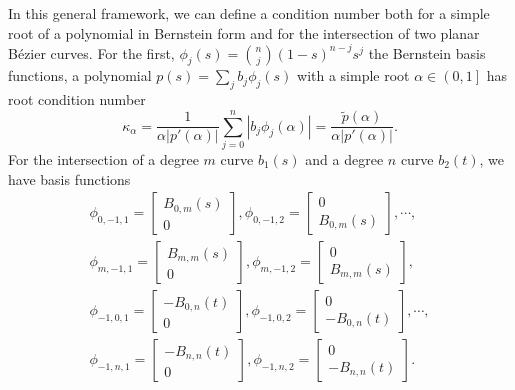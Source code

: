 In this general framework, we can define a condition number both
for a simple root of a polynomial in Bernstein form and for the
intersection of two planar B\'{e}zier curves. For the first,
\(\phi_j(s) = \binom{n}{j} (1 - s)^{n - j} s^j\) the Bernstein basis
functions, a polynomial \(p(s) = \sum_j b_j \phi_j(s)\) with
a simple root \(\alpha \in \left(0, 1\right]\) has root condition number
\begin{equation}
\kappa_{\alpha} =
  \frac{1}{\alpha \left|p'(\alpha)\right|} \sum_{j = 0}^n \left|
  b_j \phi_j(\alpha)\right| = \frac{\widetilde{p}(\alpha)}{
  \alpha \left|p'(\alpha)\right|}.
\end{equation}
For the intersection of a degree \(m\) curve \(b_1(s)\) and
a degree \(n\) curve \(b_2(t)\), we have basis functions
\begin{multline}
\phi_{0, -1, 1} = \left[ \begin{array}{c} B_{0, m}(s) \\ 0 \end{array}\right],
\phi_{0, -1, 2} = \left[ \begin{array}{c} 0 \\ B_{0, m}(s) \end{array}\right],
\cdots, \\
\phi_{m, -1, 1} = \left[ \begin{array}{c} B_{m, m}(s) \\ 0 \end{array}\right],
\phi_{m, -1, 2} = \left[ \begin{array}{c} 0 \\
  B_{m, m}(s) \end{array}\right], \\
\phi_{-1, 0, 1} = \left[ \begin{array}{c} -B_{0, n}(t) \\
  0 \end{array}\right],
\phi_{-1, 0, 2} = \left[ \begin{array}{c} 0 \\
  -B_{0, n}(t) \end{array}\right], \cdots, \\
\phi_{-1, n, 1} = \left[ \begin{array}{c} -B_{n, n}(t) \\
  0 \end{array}\right], \phi_{-1, n, 2} = \left[ \begin{array}{c} 0 \\
  -B_{n, n}(t) \end{array}\right].
\end{multline}
